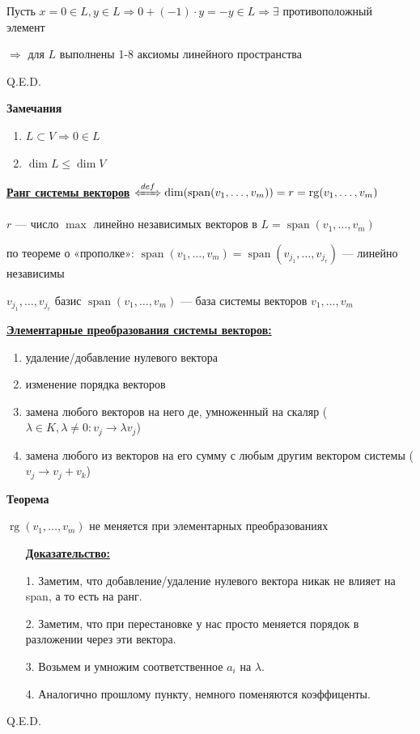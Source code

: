 \documentclass[twoside]{book}
\newcommand{\defLeftrightarrow}{\xLeftrightarrow{def}}
\DeclareMathOperator{\rg}{rg}
\DeclareMathOperator{\spann}{span}
\newcommand{\deff}[1]{\underline{\textbf{#1}}}
\begin{document}
Пусть \(x = 0 \in L, y \in L \Rightarrow 0 + (-1) \cdot y = -y \in L \Rightarrow \exists\) противоположный элемент

\(\Rightarrow\) для \(L\) выполнены 1-8 аксиомы линейного пространства

\hfill Q.E.D.

\textbf{Замечания}

\begin{enumerate}
    \item \(L \subset V \Rightarrow 0 \in L\)

    \item \(\dim L \le \dim V\)
\end{enumerate}

\deff{Ранг системы векторов} \(\defLeftrightarrow \dim (\spann (v_1, \ldots, v_m)) = r = \rg (v_1, \ldots, v_m)\)

\(r\) --- число \(\max\) линейно независимых векторов в \(L = \spann (v_1, \ldots, v_m)\)

по теореме о «прополке»: \(\spann (v_1, \ldots, v_m) = \spann (v_{j_1}, \ldots, v_{j_r})\) --- линейно независимы

\(v_{j_1}, \ldots, v_{j_r}\) базис \(\spann (v_1, \ldots, v_m)\) --- база системы векторов \(v_1, \ldots, v_m\)

\deff{Элементарные преобразования системы векторов:}

\begin{enumerate}
    \item удаление/добавление нулевого вектора

    \item изменение порядка векторов

    \item замена любого векторов на него де, умноженный на скаляр (\(\lambda \in K, \lambda \neq 0: v_j \rightarrow \lambda v_j\))

    \item замена любого из векторов на его сумму с любым другим вектором системы (\(v_j \rightarrow v_j + v_k\))
\end{enumerate}

\textbf{Теорема}

\(\rg (v_1, \ldots, v_m)\) не меняется при элементарных преобразованиях

\begin{enumerate}
    \item[] \textbf{\uline{Доказательство:}}
    \item[1.] Заметим, что добавление/удаление нулевого вектора никак не влияет на span, а то есть на ранг.
    \item[2.] Заметим, что при перестановке у нас просто меняется порядок в разложении через эти вектора.
    \item[3.] Возьмем и умножим соответственное $a_i$ на $\lambda$.
    \item[4.] Аналогично прошлому пункту, немного поменяются коэффиценты.
\end{enumerate}
\hfill Q.E.D.
\end{document}
